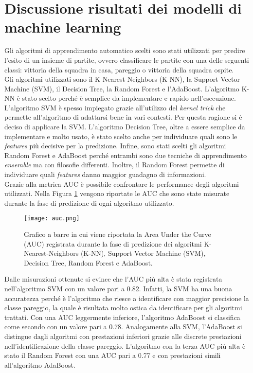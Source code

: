 \section{Discussione risultati dei modelli di machine learning}
Gli algoritmi di apprendimento automatico scelti sono stati utilizzati per predire l'esito di un insieme di partite, ovvero classificare le partite con una delle seguenti classi: vittoria della squadra in casa, pareggio o vittoria della squadra ospite.\\
Gli algoritmi utilizzati sono il K-Nearest-Neighbors (K-NN), la Support Vector Machine (SVM), il Decision Tree, la Random Forest e l'AdaBoost. L'algoritmo K-NN è stato scelto perché è semplice da implementare e rapido nell'esecuzione. L'algoritmo SVM è spesso impiegato grazie all'utilizzo del \emph{kernel trick} che permette all'algoritmo di adattarsi bene in vari contesti. Per questa ragione si è deciso di applicare la SVM. L'algoritmo Decision Tree, oltre a essere semplice da implementare e molto usato, è stato scelto anche per individuare quali sono le \emph{features} più decisive per la predizione. Infine, sono stati scelti gli algoritmi Random Forest e AdaBoost perché entrambi sono due tecniche di apprendimento \emph{ensemble} ma con filosofie differenti. Inoltre, il Random Forest permette di individuare quali \emph{features} danno maggior guadagno di informazioni.\\
Grazie alla metrica AUC è possibile confrontare le performance degli algoritmi utilizzati. Nella Figura \ref{fig:auc} vengono riportate le AUC che sono state misurate durante la fase di predizione di ogni algoritmo utilizzato.
\begin{figure}[h]
	\begin{center}
		\texttt{[image: auc.png]}
		\caption{Grafico a barre in cui viene riportata la Area Under the Curve (AUC) registrata durante la fase di predizione dei algoritmi K-Nearest-Neighbors (K-NN),  Support Vector Machine (SVM), Decision Tree, Random Forest e AdaBoost.  
		} 
		\label{fig:auc}
	\end{center}
\end{figure}
Dalle misurazioni ottenute si evince che l'AUC più alta è stata registrata nell'algoritmo SVM con un valore pari a 0.82. Infatti, la SVM ha una buona accuratezza perché è l'algoritmo che riesce a identificare con maggior precisione la classe pareggio, la quale è risultata molto ostica da identificare per gli algoritmi trattati. Con una AUC leggermente inferiore, l'algoritmo AdaBoost si classifica come secondo con un valore pari a 0.78. Analogamente alla SVM, l'AdaBoost si distingue dagli algoritmi con prestazioni inferiori grazie alle discrete prestazioni nell'identificazione della classe pareggio. L'algoritmo con la terza AUC più alta è stato il Random Forest con una AUC pari a 0.77 e con prestazioni simili all'algoritmo AdaBoost.
